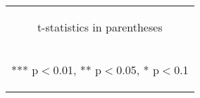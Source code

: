\documentclass[border=0.2cm]{standalone}
\begin{document}
\begin{tabular}{lcccccc}
    \bottomrule
    \multicolumn{7}{c}{\begin{footnotesize} t-statistics in parentheses\end{footnotesize}}                                                                                                                                                                                                                                   \\
    \multicolumn{7}{c}{\begin{footnotesize} *** p$<$0.01, ** p$<$0.05, * p$<$0.1\end{footnotesize}}                                                                                                                                                                                                                          \\
\end{tabular}
\end{document}

